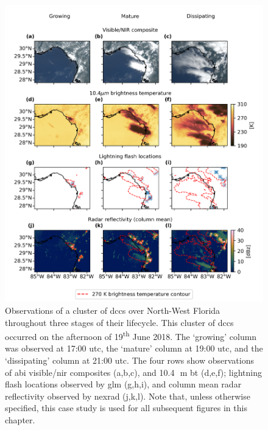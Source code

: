 \begin{figure}[tp]
    \includegraphics[width=\textwidth]{figures/chapter1_01.png}
    \caption[
    Observations of a cluster of \acrshort{dcc}s over North-West Florida throughout three stages of their lifecycle
    ]{
    Observations of a cluster of \acrshort{dcc}s over North-West Florida throughout three stages of their lifecycle. This cluster of \acrshort{dcc}s occurred on the afternoon of 19\textsuperscript{th} June 2018. The `growing' column was observed at 17:00 \acrshort{utc}, the `mature' column at 19:00 \acrshort{utc}, and the `dissipating' column at 21:00 \acrshort{utc}. The four rows show observations of \acrshort{abi} visible/\acrshort{nir} composites (a,b,c), and 10.4\,\unit{\mu m} \acrshort{bt} (d,e,f); lightning flash locations observed by \acrshort{glm} (g,h,i), and column mean radar reflectivity observed by \acrshort{nexrad} (j,k,l). Note that, unless otherwise specified, this case study is used for all subsequent figures in this chapter.
    }
    \label{fig:compare_sat_radar_glm}
\end{figure}


